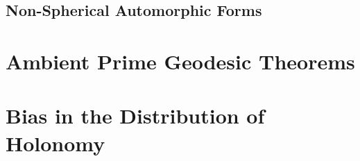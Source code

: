 \documentclass[12pt]{report}
\theoremstyle{definition}
\begin{document}


\section{Non-Spherical Automorphic Forms}






\clearpage



\chapter{Ambient Prime Geodesic Theorems} \label{AmbientPGTChapter}





\chapter{Bias in the Distribution of Holonomy} \label{BiasChapter}











%


%
\end{document}
